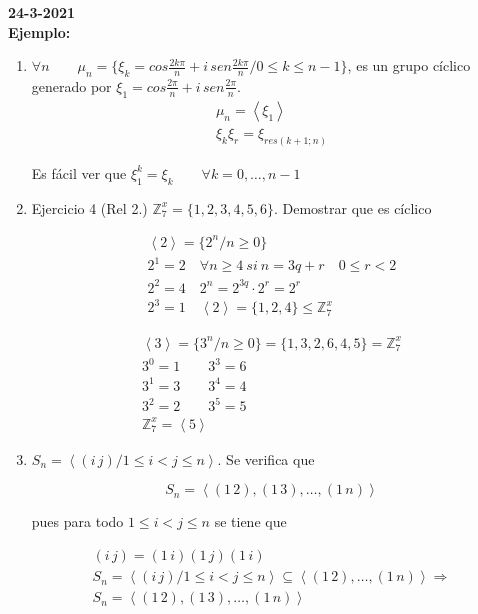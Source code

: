 \documentclass{article}
\begin{document}
\textbf{24-3-2021} \\

\textbf{Ejemplo:}
\begin{enumerate}[1)]
\item $\forall n \qquad \mu_n=\{\xi_k=cos\frac{2k\pi}{n}+i\,sen\frac{2k\pi}{n}/0\leq k\leq n-1\}$, es un grupo cíclico generado por $\xi_1=cos\frac{2\pi}{n}+i\,sen\frac{2\pi}{n}$.
\begin{gather*}
\mu_n=\left\langle \xi_1\right\rangle \\
\xi_k\xi_r=\xi_{res(k+1;n)}
\end{gather*}

Es fácil ver que $\xi_1^k=\xi_k \qquad \forall k=0,\ldots,n-1$ 

\item Ejercicio 4 (Rel 2.) $\mathbb{Z}_7^x=\{1,2,3,4,5,6\}$. Demostrar que es cíclico

\begin{gather*}
\left\langle 2 \right\rangle=\{2^n/n\geq 0\} \\
2^1=2 \quad \forall n \geq 4 \: si \: n=3q+r \quad 0\leq r < 2 \\
2^2=4 \quad 2^n=2^{3q}\cdot 2^r=2^r \\
2^3=1 \quad \left\langle 2 \right\rangle=\{1,2,4\}\leq \mathbb{Z}_7^x
\end{gather*}

\begin{gather*}
\left\langle 3 \right\rangle=\{3^n/n\geq 0\}=\{1,3,2,6,4,5\}=\mathbb{Z}_7^x \\
3^0=1 \qquad 3^3=6 \\
3^1=3 \qquad 3^4=4 \\
3^2=2 \qquad 3^5=5 \\
\mathbb{Z}_7^x=\left\langle 5 \right\rangle
\end{gather*}

\item $S_n=\left\langle (i\,j)/1\leq i < j \leq n \right\rangle$. Se verifica que

\begin{equation*}
S_n=\left\langle (1\,2), (1\,3),\ldots, (1\,n)\right\rangle
\end{equation*}

pues para todo $1\leq i< j \leq n$ se tiene que 

\begin{gather*}
(i\,j)=(1\,i)(1\,j)(1\,i) \\
S_n=\left\langle (i\,j)/1\leq i < j \leq n\right\rangle \subseteq \left\langle (1\,2),\ldots,(1\,n)\right\rangle \Rightarrow \\
S_n=\left\langle (1\,2),(1\,3),\ldots,(1\,n)\right\rangle
\end{gather*}


\end{enumerate}
\end{document}
